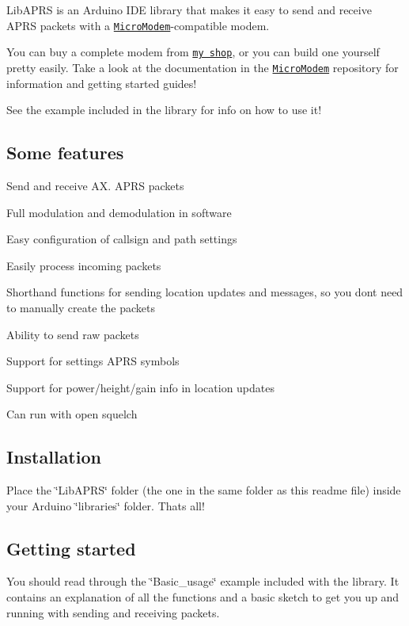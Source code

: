 Lib\+A\+P\+RS is an Arduino I\+DE library that makes it easy to send and receive A\+P\+RS packets with a \href{http://unsigned.io/micromodem}{\tt Micro\+Modem}-\/compatible modem.

You can buy a complete modem from \href{http://unsigned.io/shop}{\tt my shop}, or you can build one yourself pretty easily. Take a look at the documentation in the \href{https://github.com/markqvist/MicroModem}{\tt Micro\+Modem} repository for information and getting started guides!

See the example included in the library for info on how to use it!

\subsection*{Some features}


\begin{DoxyItemize}
\item Send and receive A\+X. A\+P\+RS packets
\item Full modulation and demodulation in software
\item Easy configuration of callsign and path settings
\item Easily process incoming packets
\item Shorthand functions for sending location updates and messages, so you don\textquotesingle{}t need to manually create the packets
\item Ability to send raw packets
\item Support for settings A\+P\+RS symbols
\item Support for power/height/gain info in location updates
\item Can run with open squelch
\end{DoxyItemize}

\subsection*{Installation}

Place the \char`\"{}\+Lib\+A\+P\+R\+S\char`\"{} folder (the one in the same folder as this readme file) inside your Arduino \char`\"{}libraries\char`\"{} folder. That\textquotesingle{}s all!

\subsection*{Getting started}

You should read through the \char`\"{}\+Basic\+\_\+usage\char`\"{} example included with the library. It contains an explanation of all the functions and a basic sketch to get you up and running with sending and receiving packets.

